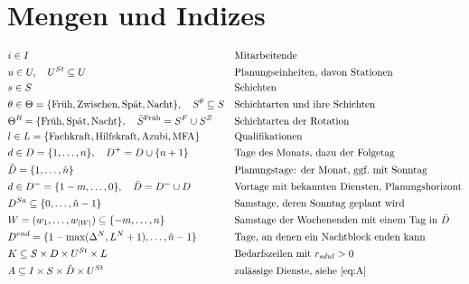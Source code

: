 \documentclass[11pt]{combiArticle}
\newcommand{\Dm}{D^{-}}
\newcommand{\Db}{\bar{D}}
\newcommand{\Dp}{D^{+}}
\begin{document}
\section{Mengen und Indizes}

\begin{align}
  & i \in I && \text{Mitarbeitende} \label{set:I}\\
  & u \in U,\quad U^{St} \subseteq U && \text{Planungseinheiten, davon Stationen} \label{set:U}\\
  & s \in S && \text{Schichten} \label{set:S}\\
  & \theta \in \Theta = \{\text{Früh}, \text{Zwischen}, \text{Spät}, \text{Nacht}\},\quad S^{\theta} \subseteq S
    && \text{Schichtarten und ihre Schichten} \label{set:Theta}\\
  & \Theta^{R} = \{\text{Früh}, \text{Spät}, \text{Nacht}\},\quad \bar S^{\text{Früh}} = S^{F} \cup S^{Z}
    && \text{Schichtarten der Rotation} \label{set:ThetaR}\\
  & l \in L = \{\text{Fachkraft}, \text{Hilfskraft}, \text{Azubi}, \text{MFA}\} && \text{Qualifikationen} \label{set:L}\\
  & d \in D = \{1,\dots,n\},\quad \Dp = D \cup \{n+1\} && \text{Tage des Monats, dazu der Folgetag} \label{set:D}\\
  & \hat D = \{1,\dots,\hat n\} && \text{Planungstage: der Monat, ggf.\ mit Sonntag} \label{set:Dhat}\\
  & d \in \Dm = \{1-m,\dots,0\},\quad \Db = \Dm \cup D && \text{Vortage mit bekannten Diensten, Planungshorizont} \label{set:Dm}\\
  & D^{Sa} \subseteq \{0,\dots,\hat n-1\} && \text{Samstage, deren Sonntag geplant wird} \label{set:DSa}\\
  & W = (w_1,\dots,w_{|W|}) \subseteq \{-m,\dots,n\} && \text{Samstage der Wochenenden mit einem Tag in } \Db \label{set:W}\\
  & D^{end} = \{1-\max(\Delta^N, L^N+1),\dots,\hat n-1\} && \text{Tage, an denen ein Nachtblock enden kann} \label{set:Dend}\\
  & K \subseteq S \times D \times U^{St} \times L && \text{Bedarfszeilen mit } r_{sdul} > 0 \label{set:K}\\
  & A \subseteq I \times S \times \hat D \times U^{St} && \text{zulässige Dienste, siehe \eqref{eq:A}} \label{set:A}
\end{align}
\end{document}
